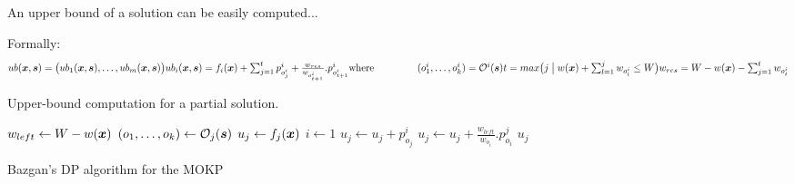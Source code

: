 An upper bound of a solution can be easily computed...

Formally:
\begin{equation*}
    ub(\boldsymbol{x}, \boldsymbol{s}) = \big(ub_1(\boldsymbol{x}, \boldsymbol{s}), \ldots, ub_m(\boldsymbol{x}, \boldsymbol{s})\big) \\
    ub_i(\boldsymbol{x}, \boldsymbol{s}) = f_i(\boldsymbol{x}) + \textstyle\sum^t_{j=1} p^i_{o^i_j} + \frac{w_{res}}{w_{o^i_{t+1}}}.p^i_{o^i_{t+1}}\\
  \text{where} \phantom{mmmmm} \\
    (o^i_1, \ldots, o^i_k) = \mathcal{O}^i(\boldsymbol{s}) \\
    t = max\big( j \;\big|\; w(\boldsymbol{x}) + \textstyle\sum_{l = 1}^j w_{o^i_l} \leq W \big) \\
    w_{res} = W - w(\boldsymbol{x}) - \sum^t_{j=1}w_{o^i_t}
\end{equation*}

\begin{algorithm}
  \caption{Upper-bound computation for a partial solution.}
  \label{alg:ub}
  \begin{algorithmic}[1]
      \State $w_{left} \gets W - w(\boldsymbol{x})$
      \State $(o_1, \ldots, o_k) \gets \mathcal{O}_{j}(\boldsymbol{s})$
      \State $u_j \gets f_j(\boldsymbol{x})$
      \State $i \gets 1$
        \State $u_j \gets u_j + p^i_{o_j}$
      \EndWhile
        \State $u_j \gets u_j + \frac{w_{left}}{w_{o_i}}.p^j_{o_i}$
      \EndIf
      \State \Return $u_j$
    \EndFunction
  \end{algorithmic}
\end{algorithm}


\begin{algorithm}
  \caption{Bazgan's DP algorithm for the MOKP}
  \label{alg:bazgan}
  
\end{algorithm}


